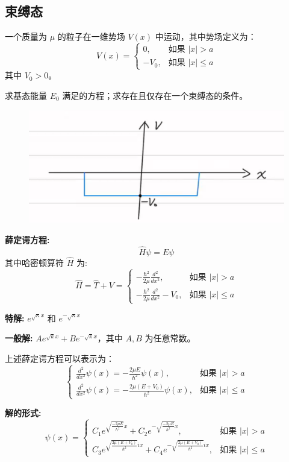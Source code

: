 \documentclass[lang=cn,10pt]{elegantbook}
\begin{document}
\subsection{束缚态}
\begin{example}
	 一个质量为 $\mu$ 的粒子在一维势场 $V(x)$ 中运动，其中势场定义为：
	\[
	V(x) = 
	\begin{cases} 
		0, & \text{如果 } |x| > a \\
		-V_0, & \text{如果 } |x| \leq a 
	\end{cases}
	\]
	其中 $V_0 > 0$。
	
	求基态能量 $E_0$ 满足的方程；求存在且仅存在一个束缚态的条件。
\end{example}
\begin{solution}
	\begin{figure}[H]
		\centering
		\includegraphics[width=0.7\linewidth]{figure/screenshot0024}
	\end{figure}
	\textbf{薛定谔方程:}
	\[
	\hat{H} \psi = E \psi
	\]
	其中哈密顿算符 $\hat{H}$ 为:
	\[
	\hat{H} = \hat{T} + V = 
	\begin{cases} 
		-\frac{\hbar^2}{2\mu} \frac{d^2}{dx^2}, & \text{如果 } |x| > a \\
		-\frac{\hbar^2}{2\mu} \frac{d^2}{dx^2} - V_0, & \text{如果 } |x| \leq a
	\end{cases}
	\]
	
	\textbf{特解:} $e^{\sqrt{\kappa} x}$ 和 $e^{-\sqrt{\kappa} x}$
	
	\textbf{一般解:} $A e^{\sqrt{k} x} + B e^{-\sqrt{k} x}$，其中 $A, B$ 为任意常数。
	
	上述薛定谔方程可以表示为：
	\[
	\begin{cases} 
		\frac{d^2}{dx^2} \psi(x) = -\frac{2\mu E}{\hbar^2} \psi(x), & \text{如果 } |x| > a \\
		\frac{d^2}{dx^2} \psi(x) = -\frac{2\mu(E + V_0)}{\hbar^2} \psi(x), & \text{如果 } |x| \leq a
	\end{cases}
	\]
	
	\textbf{解的形式:}
	\[
	\psi(x) = 
	\begin{cases} 
		C_1 e^{\sqrt{\frac{-2\mu E}{\hbar^2}} x} + C_2 e^{-\sqrt{\frac{-2\mu E}{\hbar^2}} x}, & \text{如果 } |x| > a \\
		C_3 e^{\sqrt{\frac{2\mu(E + V_0)}{\hbar^2}} ix} + C_4 e^{-\sqrt{\frac{2\mu(E + V_0)}{\hbar^2}} ix}, & \text{如果 } |x| \leq a
	\end{cases}
	\]
	

\end{solution}
\end{document}
